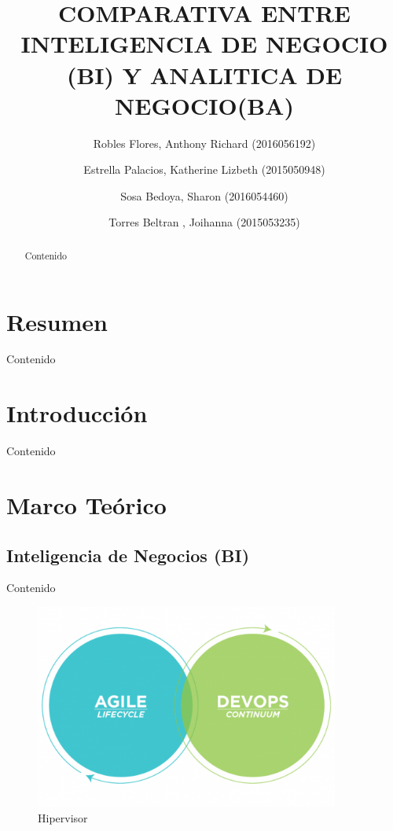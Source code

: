 \documentclass[preprint,12pt]{elsarticle}
\begin{document}
	
	\begin{frontmatter}

		\title{\huge  COMPARATIVA ENTRE INTELIGENCIA DE NEGOCIO (BI) Y ANALITICA DE NEGOCIO(BA) }
		\author{Robles Flores, Anthony Richard	                (2016056192)}
		\author{Estrella Palacios, Katherine Lizbeth			(2015050948)}
		\author{Sosa Bedoya, Sharon					(2016054460)}
		\author{Torres Beltran , Joihanna				(2015053235)}
		\address{Tacna, Perú}
		


\begin{abstract}
Contenido
\end{abstract}


\end{frontmatter}

\section{Resumen}
Contenido


\section{Introducción}
Contenido



\section{Marco Teórico}

	\subsection{Inteligencia de Negocios (BI)}
	Contenido\cite{referenciarobles1}



\begin{figure}[htb]
\begin{center}
\includegraphics[width=10cm]{./IMAGENES/evolucion}
\caption{Hipervisor}
\end{center}
\end{figure}
\end{document}
